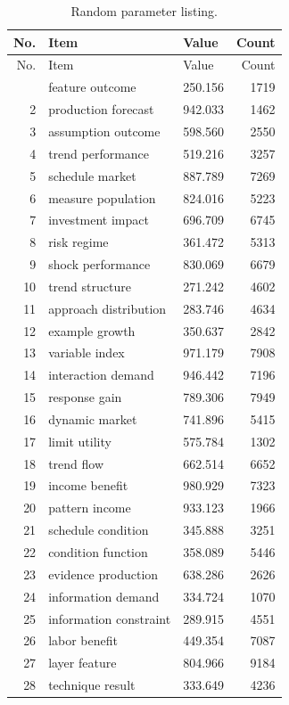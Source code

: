 \documentclass[11pt]{report}
\begin{document}
\begin{longtable}{rllr}\caption{Random parameter listing.}\label{tab:l12}\\\toprule No. & Item & Value & Count \\ \midrule \endfirsthead\toprule No. & Item & Value & Count \\ \midrule \endhead\bottomrule \endfoot
1 & feature outcome & 250.156 & 1719 \\
2 & production forecast & 942.033 & 1462 \\
3 & assumption outcome & 598.560 & 2550 \\
4 & trend performance & 519.216 & 3257 \\
5 & schedule market & 887.789 & 7269 \\
6 & measure population & 824.016 & 5223 \\
7 & investment impact & 696.709 & 6745 \\
8 & risk regime & 361.472 & 5313 \\
9 & shock performance & 830.069 & 6679 \\
10 & trend structure & 271.242 & 4602 \\
11 & approach distribution & 283.746 & 4634 \\
12 & example growth & 350.637 & 2842 \\
13 & variable index & 971.179 & 7908 \\
14 & interaction demand & 946.442 & 7196 \\
15 & response gain & 789.306 & 7949 \\
16 & dynamic market & 741.896 & 5415 \\
17 & limit utility & 575.784 & 1302 \\
18 & trend flow & 662.514 & 6652 \\
19 & income benefit & 980.929 & 7323 \\
20 & pattern income & 933.123 & 1966 \\
21 & schedule condition & 345.888 & 3251 \\
22 & condition function & 358.089 & 5446 \\
23 & evidence production & 638.286 & 2626 \\
24 & information demand & 334.724 & 1070 \\
25 & information constraint & 289.915 & 4551 \\
26 & labor benefit & 449.354 & 7087 \\
27 & layer feature & 804.966 & 9184 \\
28 & technique result & 333.649 & 4236 \\

\end{longtable}
\end{document}
